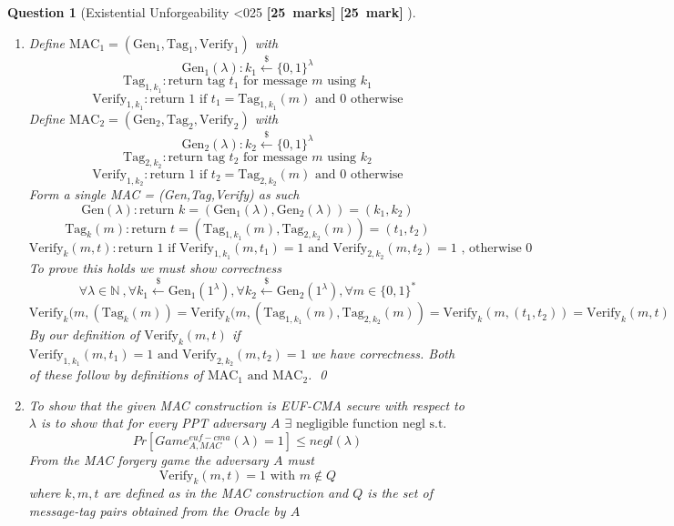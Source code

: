 \documentclass[a4paper]{article}
\theoremstyle{que}
\newtheorem{question}{Question}
\newcommand{\fixoffset}{\mbox{}\vspace*{-\bigskipamount}\vspace*{-\medskipamount}}
\newcommand\points[1]{%
\ifnum1<0#1\relax%
    {\bf \small [#1~marks]}%
  \else%
    {\bf \small [#1~mark]}%
  \fi%
}%
\begin{document}
\begin{question}[Existential Unforgeability \points{25}]
  \fixoffset
  \begin{enumerate}[label=(\alph*)]
    \item Define \(\text{MAC}_1 = (\text{Gen}_1 , \text{Tag}_1 , \text{Verify}_1)\) with
    \[\text{Gen}_1(\lambda) : k_1 \xleftarrow{\$} \{0,1\}^{\lambda}\]
    \[\text{Tag}_{1,k_1} : \text{return tag } t_1 \text{ for message } m \text{ using } k_1\]
    \[\text{Verify}_{1,k_1} : \text{return 1 if } t_1 = \text{Tag}_{1,k_1}(m) \text{ and 0 otherwise}\]
    Define \(\text{MAC}_2 = (\text{Gen}_2 , \text{Tag}_2 , \text{Verify}_2)\) with
    \[\text{Gen}_2(\lambda) : k_2 \xleftarrow{\$} \{0,1\}^{\lambda}\]
    \[\text{Tag}_{2,k_2} : \text{return tag } t_2 \text{ for message } m \text{ using } k_2\]
    \[\text{Verify}_{1,k_2} : \text{return 1 if } t_2 = \text{Tag}_{2,k_2}(m) \text{ and 0 otherwise}\]
    Form a single MAC = (Gen,Tag,Verify) as such
    \[\text{Gen}(\lambda) : \text{return } k=(\text{Gen}_1(\lambda),\text{Gen}_2(\lambda)) = (k_1,k_2) \]
    \[\text{Tag}_k(m) :  \text{return } t = (\text{Tag}_{1,k_1}(m),\text{Tag}_{2,k_2}(m)) = (t_1,t_2)\]
    \[\text{Verify}_k(m,t) : \text{return 1 if } \text{Verify}_{1,k_1}(m,t_1) = 1 \text{ and } \text{Verify}_{2,k_2}(m,t_2) = 1 \text{ , otherwise 0}\]
    To prove this holds we must show correctness
    \[\forall \lambda \in \mathbb{N}\ , \forall k_1 \xleftarrow{\$} \text{Gen}_1(1^\lambda) , \forall k_2 \xleftarrow{\$} \text{Gen}_2(1^\lambda) , \forall m \in \{0,1\}^*\]
    \[\text{Verify}_k(m,(\text{Tag}_k(m)) = \text{Verify}_k(m,(\text{Tag}_{1,k_1}(m),\text{Tag}_{2,k_2}(m))  = \text{Verify}_k(m,(t_1,t_2)) = \text{Verify}_k(m,t)\]
    By our definition of \(\text{Verify}_k(m,t)\) if \(\text{Verify}_{1,k_1}(m,t_1) = 1 \text{ and } \text{Verify}_{2,k_2}(m,t_2) = 1\) we have correctness. Both of these follow by definitions of \( \text{MAC}_1 \text{ and } \text{MAC}_2 \). \qed
    
     
    \item To show that the given MAC construction is EUF-CMA secure with respect to \(\lambda\) is to show that for every PPT adversary \(A\) \(\exists \text{ negligible function negl s.t.}\)
    \[Pr[Game_{A,MAC}^{euf-cma}(\lambda) = 1] \leq negl(\lambda)\]
    From the MAC forgery game the adversary \(A\) must 
    \[\text{Verify}_k(m,t) = 1 \text{ with } m\notin Q\]
    where \(k,m,t\) are defined as in the MAC construction and \(Q\) is the set of message-tag pairs obtained from the Oracle by \(A\)
    

\end{enumerate}
\end{question}
\end{document}
